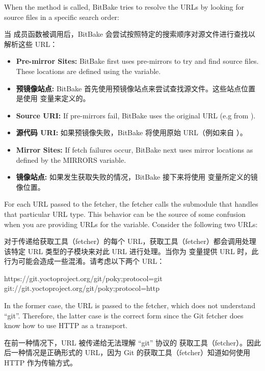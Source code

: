 When the  method is called, BitBake tries to resolve the URLs by looking for source files in a specific search order:

当  成员函数被调用后，BitBake 会尝试按照特定的搜索顺序对源文件进行查找以解析这些 URL：

\begin{itemize}
\setlength\itemsep{1.0em}
\item \textbf{Pre-mirror Sites:} BitBake first uses pre-mirrors to try and find source files. These locations are defined using the  variable.
\item \textbf{预镜像站点:} BitBake 首先使用预镜像站点来尝试查找源文件。这些站点位置是使用  变量来定义的。

\item \textbf{Source URI:} If pre-mirrors fail, BitBake uses the original URL (e.g from ).
\item \textbf{源代码 URI:} 如果预镜像失败，BitBake 将使用原始 URL（例如来自 ）。

\item \textbf{Mirror Sites:} If fetch failures occur, BitBake next uses mirror locations as defined by the MIRRORS variable.
\item \textbf{镜像站点:} 如果发生获取失败的情况，BitBake 接下来将使用  变量所定义的镜像位置。
\end{itemize}

For each URL passed to the fetcher, the fetcher calls the submodule that handles that particular URL type. This behavior can be the source of some confusion when you are providing URLs for the  variable. Consider the following two URLs:

对于传递给获取工具（fetcher）的每个 URL，获取工具（fetcher）都会调用处理该特定 URL 类型的子模块来对此 URL 进行处理。当你为  变量提供 URL 时，此行为可能会造成一些混淆。请考虑以下两个 URL：

\begin{pyglist}
https://git.yoctoproject.org/git/poky;protocol=git
git://git.yoctoproject.org/git/poky;protocol=http
\end{pyglist}

In the former case, the URL is passed to the  fetcher, which does not understand ``git''. Therefore, the latter case is the correct form since the Git fetcher does know how to use HTTP as a transport.

在前一种情况下，URL 被传递给无法理解 ``git'' 协议的  获取工具（fetcher）。因此后一种情况是正确形式的 URL，因为 Git 的获取工具（fetcher）知道如何使用 HTTP 作为传输方式。

